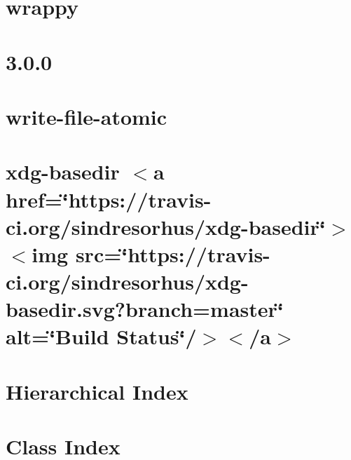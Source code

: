 \let\mypdfximage\pdfximage\def\pdfximage{\immediate\mypdfximage}\documentclass[twoside]{book}
\newcommand{\+}{\discretionary{\mbox{\scriptsize$\hookleftarrow$}}{}{}}
\begin{document}
\chapter{wrappy}
\label{md__c_1__git_hub__p_r_o_y_e_c_t_o-_i_i_i-_g_o_t_rest-api-node-mysql_node_modules_wrappy__r_e_a_d_m_e}

\chapter{3.0.0}
\label{md__c_1__git_hub__p_r_o_y_e_c_t_o-_i_i_i-_g_o_t_rest-api-node-mysql_node_modules_write-file-atomic__c_h_a_n_g_e_l_o_g}

\chapter{write-\/file-\/atomic}
\label{md__c_1__git_hub__p_r_o_y_e_c_t_o-_i_i_i-_g_o_t_rest-api-node-mysql_node_modules_write-file-atomic__r_e_a_d_m_e}

\chapter{xdg-\/basedir $<$a href=\char`\"{}https\+://travis-\/ci.\+org/sindresorhus/xdg-\/basedir\char`\"{}$>$$<$img src=\char`\"{}https\+://travis-\/ci.\+org/sindresorhus/xdg-\/basedir.\+svg?branch=master\char`\"{} alt=\char`\"{}\+Build Status\char`\"{}/$>$$<$/a$>$}
\label{md__c_1__git_hub__p_r_o_y_e_c_t_o-_i_i_i-_g_o_t_rest-api-node-mysql_node_modules_xdg-basedir_readme}

\chapter{Hierarchical Index}

\chapter{Class Index}

\end{document}
